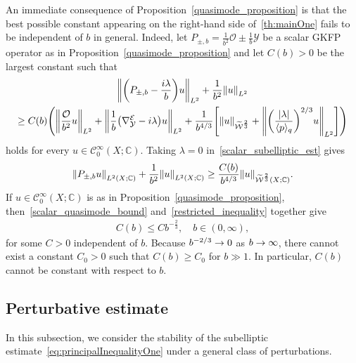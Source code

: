 \documentclass[10pt]{amsart}
\theoremstyle{definition}\newtheorem{defi}[theo]{Definition}\newtheorem{rema}[theo]{Remark}\newtheorem{exam}[theo]{Example}\newtheorem{exem}[theo]{Example}\newtheorem{nota}[theo]{Notation}
\newcommand{\C}{\mathbb{C}}
\newcommand{\clW}{\mathcal{W}}
\newcommand{\clC}{\mathcal{C}}
\newcommand{\clY}{\mathcal{Y}}
\newcommand{\clO}{\mathcal{O}}
\newcommand{\clE}{\mathcal{E}}
\newcommand{\abs}[1]{\left| #1 \right|}
\newcommand\norm[1]{\left\lVert#1\right\rVert}
\let\originalleft\left
\let\originalright\right
\renewcommand{\left}{\mathopen{}\mathclose\bgroup\originalleft}
\renewcommand{\right}{\aftergroup\egroup\originalright}
\renewcommand*{\to}{\mathchoice{\longrightarrow}{\rightarrow}{\rightarrow}{\rightarrow}}
\begin{document}
An immediate consequence of Proposition~\ref{quasimode_proposition} is that the best possible constant appearing on the right-hand side of~\eqref{th:mainOne} fails to be independent of $b$ in general. Indeed, let $P_{\pm,b} = \frac{1}{b^2} \clO\pm \frac{1}{b} \clY$ be a scalar GKFP operator as in Proposition~\ref{quasimode_proposition} and let $C(b)>0$ be the largest constant such that
\begin{multline}\label{scalar_subelliptic_est}
\left\| \left(P_{\pm,b} - \frac{i\lambda}{b}\right)u\right\|_{L^{2}}+\frac{1}{b^2}\norm{u}_{L^2} \\
\geq C(b)
\Bigg(\left\| \frac{\clO}{b^{2}}u \right\|_{L^{2}} +
\left\|
\frac{1}{b}\left(\nabla^{\clE}_{\clY} - i\lambda \right)u
\right\|_{L^{2}}
+ \frac{1}{b^{4/3}}\left[\|u\|_{\widetilde{\clW}^{\frac{2}{3}}} + \norm{\left(\frac{\abs{\lambda}}{\langle p \rangle_q} \right)^{2/3} u}_{L^2}\right]
\Bigg)
\end{multline}
holds for every $u\in \clC^\infty_{0}(X; \C)$. Taking $\lambda = 0$ in~\eqref{scalar_subelliptic_est} gives
\begin{equation}\label{restricted_inequality}
\norm{P_{\pm,b} u}_{L^2(X;\C)} + \frac{1}{b^2} \norm{u}_{L^2(X;\C)} \ge \frac{C(b)}{b^{4/3}} \norm{u}_{\widetilde{\clW}^{\frac{2}{3}}(X;\C)}.
\end{equation}
If $u \in \clC^\infty_{0}(X; \C)$ is as in Proposition~\ref{quasimode_proposition}, then~\eqref{scalar_quasimode_bound} and~\eqref{restricted_inequality} together give
\begin{align}
C(b) \le C b^{-\frac{2}{3}}, \quad b \in (0,\infty),
\end{align}
for some $C>0$ independent of $b$. Because $b^{-2/3} \to 0$ as $b \to \infty$, there cannot exist a constant $C_0>0$ such that $C(b) \ge C_0$ for $b \gg 1$. In particular, $C(b)$ cannot be constant with respect to $b$.

\subsection{Perturbative estimate}\label{sec:perturb}
In this subsection, we consider the stability of the subelliptic estimate~\eqref{eq:principalInequalityOne} under a general class of perturbations.
\end{document}
